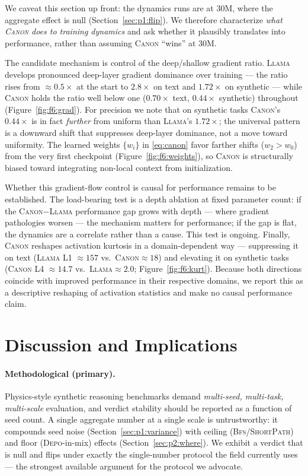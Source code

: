 \documentclass{article}
\newcommand{\Canon}{\textsc{Canon}\xspace}
\newcommand{\Depo}{\textsc{Depo}\xspace}
\newcommand{\Bfs}{\textsc{Bfs}\xspace}
\newcommand{\ShortPath}{\textsc{ShortPath}\xspace}
\newcommand{\Llama}{\textsc{Llama}\xspace}
\begin{document}
We caveat this section up front: the dynamics runs are at 30M, where the aggregate effect is null
(Section~\ref{sec:p1:flip}). We therefore characterize \emph{what \Canon does to training
dynamics} and ask whether it plausibly translates into performance, rather than assuming \Canon
``wins'' at 30M.

The candidate mechanism is control of the deep/shallow gradient ratio. \Llama develops pronounced
deep-layer gradient dominance over training --- the ratio rises from $\approx0.5\times$ at the
start to $2.8\times$ on text and $1.72\times$ on synthetic --- while \Canon holds the ratio well
below one ($0.70\times$ text, $0.44\times$ synthetic) throughout (Figure~\ref{fig:f6:grad}). For
precision we note that on synthetic tasks \Canon's $0.44\times$ is in fact \emph{further} from
uniform than \Llama's $1.72\times$; the universal pattern is a downward shift that suppresses
deep-layer dominance, not a move toward uniformity. The learned weights $\{w_i\}$ in
\eqref{eq:canon} favor farther shifts ($w_2 > w_0$) from the very first checkpoint
(Figure~\ref{fig:f6:weights}), so \Canon is structurally biased toward integrating non-local
context from initialization.

Whether this gradient-flow control is causal for performance remains to be established. The
load-bearing test is a depth ablation at fixed parameter count: if the \Canon$-$\Llama performance
gap grows with depth --- where gradient pathologies worsen --- the mechanism matters for
performance; if the gap is flat, the dynamics are a correlate rather than a cause. This test is
ongoing. Finally, \Canon reshapes activation kurtosis in a domain-dependent way --- suppressing it
on text (\Llama L1 $\approx157$ vs.\ \Canon $\approx18$) and elevating it on synthetic tasks
(\Canon L4 $\approx14.7$ vs.\ \Llama $\approx2.0$; Figure~\ref{fig:f6:kurt}). Because both directions
coincide with improved performance in their respective domains, we report this as a descriptive
reshaping of activation statistics and make no causal performance claim.

\section{Discussion and Implications}
\label{sec:discussion}

\paragraph{Methodological (primary).} Physics-style synthetic reasoning benchmarks demand
\emph{multi-seed, multi-task, multi-scale} evaluation, and verdict stability should be reported as
a function of seed count. A single aggregate number at a single scale is untrustworthy: it
compounds seed noise (Section~\ref{sec:p1:variance}) with ceiling (\Bfs/\ShortPath) and floor
(\Depo-in-mix) effects (Section~\ref{sec:p2:where}). We exhibit a verdict that is null and flips
under exactly the single-number protocol the field currently uses --- the strongest available
argument for the protocol we advocate.
\end{document}

